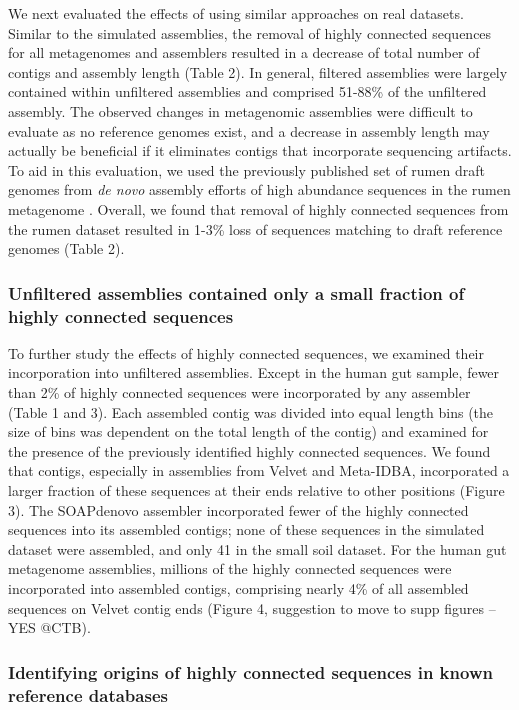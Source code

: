 \documentclass[10pt]{article}
\begin{document}
We next evaluated the effects of using similar approaches on
real datasets.  Similar to the simulated assemblies, the
removal of highly connected sequences for all metagenomes and
assemblers resulted in a decrease of total number of contigs and assembly
length (Table 2).  In general, filtered assemblies were largely
contained within unfiltered assemblies and comprised 51-88\% of the
unfiltered assembly.  The observed changes in metagenomic assemblies
were difficult to evaluate as no reference genomes exist, 
and a decrease in assembly length may actually be beneficial if it
eliminates contigs that incorporate sequencing artifacts.
To aid in this evaluation, we used the previously published set of
rumen draft genomes from \emph{de novo} assembly efforts of high
abundance sequences in the rumen metagenome \cite{Hess:2011p686}.
Overall, we found that removal of highly connected sequences from the
rumen dataset resulted in 1-3\% loss of sequences matching to
draft reference genomes (Table 2).

\subsubsection*{Unfiltered assemblies contained only a small fraction of highly connected sequences}
To further study the effects of highly connected sequences, we
examined their incorporation into unfiltered assemblies.  Except in
the human gut sample, fewer than 2\% of highly connected sequences
were incorporated by any assembler (Table 1 and 3).  Each assembled
contig was divided into equal length bins (the size of bins was
dependent on the total length of the contig) and examined for the
presence of the previously identified highly connected sequences.  We
found that contigs, especially in assemblies from Velvet and
Meta-IDBA, incorporated a larger fraction of these sequences at their
ends relative to other positions (Figure 3).  The SOAPdenovo
assembler incorporated fewer of the highly connected sequences into
its assembled contigs; none of these sequences in the simulated
dataset were assembled, and only 41 in the small soil dataset.  For
the human gut metagenome assemblies, millions of the highly connected
sequences were incorporated into assembled contigs, comprising nearly
4\% of all assembled sequences on Velvet contig ends (Figure 4,
suggestion to move to supp figures -- YES @CTB).

\subsubsection*{Identifying origins of highly connected sequences in known reference databases}
\end{document}
